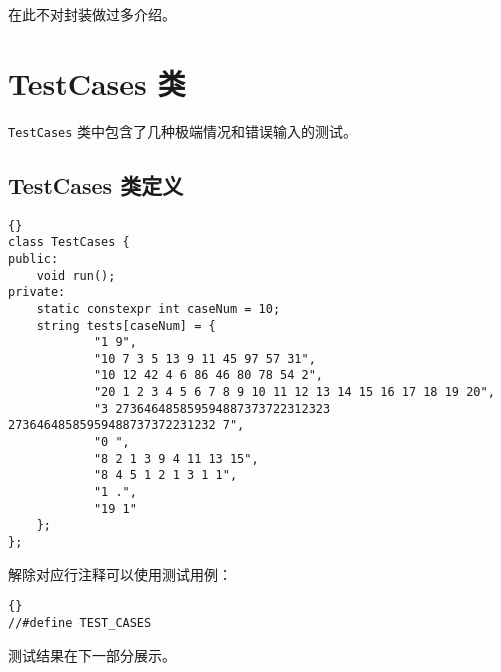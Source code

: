 在此不对封装做过多介绍。

\chapter{TestCases 类}

\lstinline{TestCases} 类中包含了几种极端情况和错误输入的测试。

\section{TestCases 类定义}

\begin{lstlisting}[firstnumber=609, caption=TestCases 类定义]{}
class TestCases {
public:
    void run();
private:
    static constexpr int caseNum = 10;
    string tests[caseNum] = {
            "1 9",
            "10 7 3 5 13 9 11 45 97 57 31",
            "10 12 42 4 6 86 46 80 78 54 2",
            "20 1 2 3 4 5 6 7 8 9 10 11 12 13 14 15 16 17 18 19 20",
            "3 273646485859594887373722312323 27364648585959488737372231232 7",
            "0 ",
            "8 2 1 3 9 4 11 13 15",
            "8 4 5 1 2 1 3 1 1",
            "1 .",
            "19 1"
    };
};
\end{lstlisting}

解除对应行注释可以使用测试用例：

\begin{lstlisting}[firstnumber=648, caption=使用测试用例]{}
//#define TEST_CASES
\end{lstlisting}

测试结果在下一部分展示。